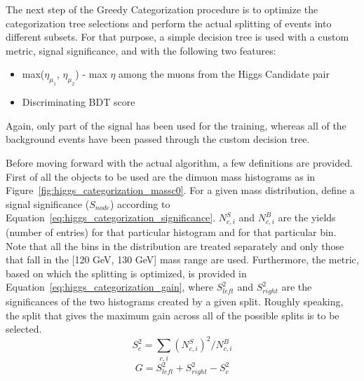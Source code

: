 The next step of the Greedy Categorization procedure is to optimize the categorization tree selections and perform the actual splitting of events into different subsets. For that purpose, a simple decision tree is used with a custom metric, signal significance, and with the following two features:
\begin{itemize}
  \item max($\eta_{\mu_1}$, $\eta_{\mu_2}$) - max $\eta$ among the muons from the Higgs Candidate pair
  \item Discriminating BDT score
\end{itemize}
Again, only part of the signal has been used for the training, whereas all of the background events have been passed through the custom decision tree.

Before moving forward with the actual algorithm, a few definitions are provided. First of all the objects to be used are the dimuon mass histograms as in Figure~\ref{fig:higgs_categorization_massc0}. For a given mass distribution, define a signal significance ($S_{node}$) according to Equation~\ref{eq:higgs_categorization_significance}. $N^{S}_{c,i}$ and $N^{B}_{c,i}$ are the yields (number of entries) for that particular histogram and for that particular bin. Note that all the bins in the distribution are treated separately and only those that fall in the [120 GeV, 130 GeV] mass range are used. Furthermore, the metric, based on which the splitting is optimized, is provided in Equation~\ref{eq:higgs_categorization_gain}, where $S^2_{left}$ and $S^2_{right}$ are the significances of the two histograms created by a given split. Roughly speaking, the split that gives the maximum gain across all of the possible splits is to be selected.
\begin{equation}
  {S^2_c} = \sum_{c,i}(N^{S}_{c,i})^2/N^{B}_{c,i}
  \label{eq:higgs_categorization_significance}
\end{equation}
\begin{equation}
  {G} = {S^2_{left}} + {S^2_{right}} - {S^2_{c}}
  \label{eq:higgs_categorization_gain}
\end{equation}
